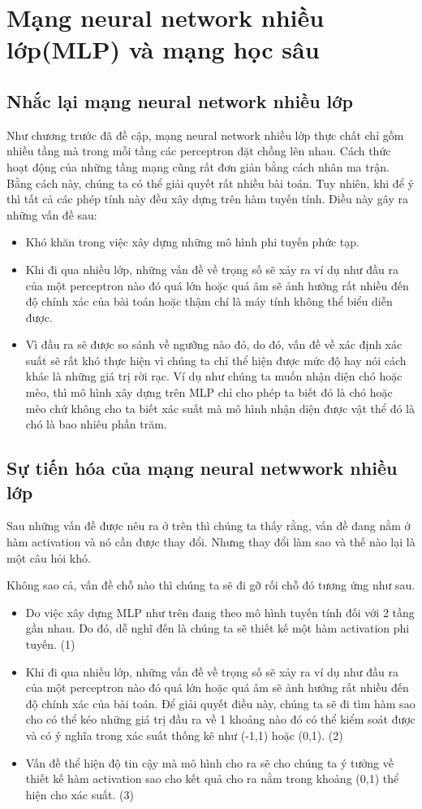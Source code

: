 \section{Mạng neural network nhiều lớp(MLP) và mạng học sâu}
\subsection{Nhắc lại mạng neural network nhiều lớp}
Như chương trước đã đề cập, mạng neural network nhiều lớp thực chất chỉ gồm nhiều tầng mà trong mỗi tầng các perceptron đặt chồng lên nhau. Cách thức hoạt động của những tầng mạng cũng rất đơn giản bằng cách nhân ma trận. Bằng cách này, chúng ta có thể giải quyết rất nhiều bài toán. Tuy nhiên, khi để ý thì tất cả các phép tính này đều xây dựng trên hàm tuyến tính. Điều này gây ra những vấn đề sau:
\begin{itemize}
    \item Khó khăn trong việc xây dựng những mô hình phi tuyến phức tạp.
    \item Khi đi qua nhiều lớp, những vấn đề về trọng số sẽ xảy ra ví dụ như đầu ra của một perceptron nào đó quá lớn hoặc quá âm sẽ ảnh hưởng rất nhiều đến độ chính xác của bài toán hoặc thậm chí là máy tính không thể biểu diễn được.
    \item Vì đầu ra sẽ được so sánh về ngưỡng nào đó, do đó, vấn đề về xác định xác suất sẽ rất khó thực hiện vì chúng ta chỉ thể hiện được mức độ hay nói cách khác là những giá trị rời rạc. Ví dụ như chúng ta muốn nhận diện chó hoặc mèo, thì mô hình xây dựng trên MLP chỉ cho phép ta biết đó là chó hoặc mèo chứ không cho ta biết xác suất mà mô hình nhận diện được vật thể đó là chó là bao nhiêu phần trăm.
\end{itemize}

\subsection{Sự tiến hóa của mạng neural netwwork nhiều lớp}
Sau những vấn đề được nêu ra ở trên thì chúng ta thấy rằng, vấn đề đang nằm ở hàm activation và nó cần được thay đổi. Nhưng thay đổi làm sao và thế nào lại là một câu hỏi khó.

Không sao cả, vấn đề chỗ nào thì chúng ta sẽ đi gỡ rối chỗ đó tương ứng như sau.
\begin{itemize}
    \item Do việc xây dựng MLP như trên đang theo mô hình tuyến tính đối với 2 tầng gần nhau. Do đó, dễ nghĩ đến là chúng ta sẽ thiết kế một hàm activation phi tuyến. (1)
    \item Khi đi qua nhiều lớp, những vấn đề về trọng số sẽ xảy ra ví dụ như đầu ra của một perceptron nào đó quá lớn hoặc quá âm sẽ ảnh hưởng rất nhiều đến độ chính xác của bài toán. Để giải quyết điều này, chúng ta sẽ đi tìm hàm sao cho có thể kéo những giá trị đầu ra về 1 khoảng nào đó có thể kiểm soát được và có ý nghĩa trong xác suất thống kê như (-1,1) hoặc (0,1). (2)
    \item Vấn đề thể hiện độ tin cậy mà mô hình cho ra sẽ cho chúng ta ý tưởng về thiết kế hàm activation sao cho kết quả cho ra nằm trong khoảng (0,1) thể hiện cho xác suất. (3)
\end{itemize}

